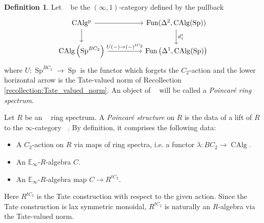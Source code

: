 \documentclass{article}
\DeclareMathOperator{\CAlg}{CAlg} %
\DeclareMathOperator{\CAlgp}{CAlg^p} %
\DeclareMathOperator{\Einfty}{\mathbf{E}_\infty} %
\DeclareMathOperator{\Spectra}{Sp} %
\newcommand{\EE}{\mathbb{E}}
\theoremstyle{definition}
\newtheorem{definition}[equation]{Definition}
\begin{document}
\begin{definition}
    \label{definition:poincare_ring_spectrum}
    Let $\CAlgp$ be the $(\infty,1)$-category defined by the pullback 
    \begin{equation}\label{diagram:poincare_ring_defn}    
    \begin{tikzcd}
    \CAlgp \arrow[rr]\arrow[d] & & \operatorname{Fun}(\Delta^2, \CAlg(\Spectra))\arrow[d,"d_1^*"]\\
    \CAlg\left(\Spectra^{BC_2}\right)\arrow[rr,"U(-)\to (-)^{tC_2}"] & & \operatorname{Fun}\left(\Delta^1, \CAlg(\Spectra)\right)
    \end{tikzcd}
    \end{equation}
    where $U:\Spectra^{BC_2}\to \Spectra$ is the functor which forgets the $C_2$-action and the lower horizontal arrow is the Tate-valued norm of Recollection \ref{recollection:Tate_valued_norm}. 
    An object of $ \CAlgp $ will be called a \emph{Poincaré ring spectrum}.

    Let $R$ be an $ \Einfty $ ring spectrum. 
    A \emph{Poincaré structure} on $R$ is the data of a lift of $ R $ to the $ \infty $-category $ \CAlgp $. 
    By definition, it comprises the following data:
    \begin{itemize}
        \item A $C_2$-action on $R$ via maps of ring spectra, i.e. a functor $\lambda: BC_2\rightarrow \CAlg$.
        \item An $ \EE_\infty $-$R$-algebra $ C$.
        \item An $ \EE_\infty $-$R$-algebra map $C\rightarrow R^{tC_2}$. 
    \end{itemize}
    Here $R^{tC_2}$ is the Tate construction with respect to the given action. 
    Since the Tate construction is lax symmetric monoidal, $R^{tC_2}$ is naturally an $R$-algebra via the Tate-valued norm. 
\end{definition}
\end{document}
